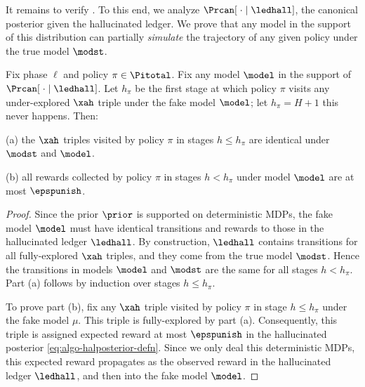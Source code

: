 It remains to verify . To this end, we analyze
    $\Prcan[\;\cdot \mid \ledhall]$,
the canonical posterior given the hallucinated ledger. We prove that any model in the support of this distribution can partially \emph{simulate} the trajectory of any given policy under the true model $\modst$.

\begin{lemma}\label{lem:modclass_not}
Fix phase $\ell$ and policy $\pi \in \Pitotal$. Fix any model $\model$ in the support of
    $\Prcan[\;\cdot \mid \ledhall]$.
Let $h_\pi$ be the first stage at which policy $\pi$ visits any under-explored $\xah$ triple under the fake model $\model$; let $h_\pi=H+1$ this never happens. Then:
\begin{OneLiners}
\item[(a)]
the $\xah$ triples visited by policy $\pi$ in stages $h\leq h_\pi$ are identical under $\modst$ and $\model$.
\item[(b)]
all rewards collected by policy $\pi$ in stages $h<h_\pi$ under model $\model$ are at most $\epspunish$.
\end{OneLiners}
\end{lemma}

\begin{proof}
Since the prior $\prior$ is supported on deterministic MDPs, the fake model $\model$ must have identical transitions and rewards to those in the hallucinated ledger $\ledhall$. By construction, $\ledhall$ contains transitions for all fully-explored $\xah$ triples, and they come from the true model $\modst$. Hence the transitions in models $\model$ and $\modst$ are the same for all stages $h < h_\pi$. Part (a) follows by induction over stages $h \le h_\pi$.

To prove part (b), fix any $\xah$ triple visited by policy $\pi$ in stage $h\leq h_\pi$ under the fake model $\mu$. This triple is fully-explored by part (a). Consequently, this triple is assigned expected reward at most $\epspunish$ in the hallucinated posterior \eqref{eq:algo-halposterior-defn}. Since we only deal this deterministic MDPs, this expected reward propagates as the observed reward in the hallucinated ledger $\ledhall$, and then into the fake model $\model$.
\end{proof}

